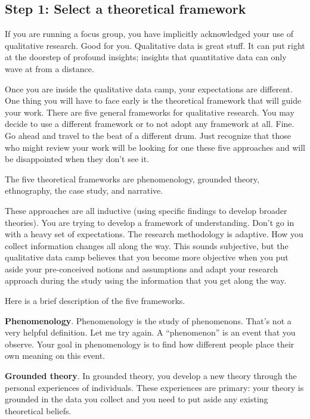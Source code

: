 \documentclass[
  letterpaper,
  DIV=11,
  numbers=noendperiod]{scrreprt}
\begin{document}
\begin{tcolorbox}
\section{Step 1: Select a theoretical
framework}\label{step-1-select-a-theoretical-framework}

If you are running a focus group, you have implicitly acknowledged your
use of qualitative research. Good for you. Qualitative data is great
stuff. It can put right at the doorstep of profound insights; insights
that quantitative data can only wave at from a distance.

Once you are inside the qualitative data camp, your expectations are
different. One thing you will have to face early is the theoretical
framework that will guide your work. There are five general frameworks
for qualitative research. You may decide to use a different framework or
to not adopt any framework at all. Fine. Go ahead and travel to the beat
of a different drum. Just recognize that those who might review your
work will be looking for one these five approaches and will be
disappointed when they don't see it.

The five theoretical frameworks are phenomenology, grounded theory,
ethnography, the case study, and narrative.

These approaches are all inductive (using specific findings to develop
broader theories). You are trying to develop a framework of
understanding. Don't go in with a heavy set of expectations. The
research methodology is adaptive. How you collect information changes
all along the way. This sounds subjective, but the qualitative data camp
believes that you become more objective when you put aside your
pre-conceived notions and assumptions and adapt your research approach
during the study using the information that you get along the way.

Here is a brief description of the five frameworks.

\textbf{Phenomenology}. Phenomenology is the study of phenomenons.
That's not a very helpful definition. Let me try again. A ``phenomenon''
is an event that you observe. Your goal in phenomenology is to find how
different people place their own meaning on this event.

\textbf{Grounded theory}. In grounded theory, you develop a new theory
through the personal experiences of individuals. These experiences are
primary: your theory is grounded in the data you collect and you need to
put aside any existing theoretical beliefs.


\end{tcolorbox}
\end{document}
